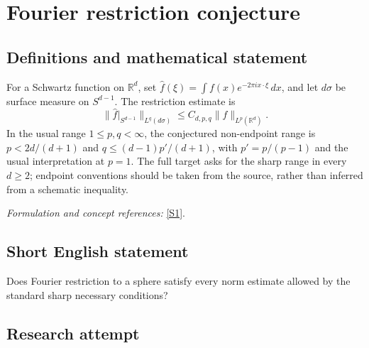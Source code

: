 \documentclass[11pt,a4paper]{article}
\newcommand{\R}{\mathbb{R}}
\newcommand{\sref}[2]{\hyperlink{source:#1:#2}{[S#2]}}
\newif\ifshowcatalogue
\newcommand{\cataloguescope}[1]{\ifshowcatalogue
 \paragraph{Exact scope in the supplied catalogue.}
 \begin{quote}\small #1\end{quote}\fi}
\numberwithin{equation}{section}
\begin{document}
\setcounter{section}{45}
\clearpage
\section{\texorpdfstring{Fourier restriction conjecture}{Fourier restriction conjecture}}\label{46}
\subsection{Definitions and mathematical statement}
For a Schwartz function on $\R^d$, set $\widehat f(\xi)=\int f(x)e^{-2\pi i x\cdot\xi}\,dx$, and let $d\sigma$ be surface measure on $S^{d-1}$. The restriction estimate is
\[
 \|\widehat f|_{S^{d-1}}\|_{L^q(d\sigma)}\le C_{d,p,q}\|f\|_{L^p(\R^d)}.
\]
In the usual range $1\le p,q<\infty$, the conjectured non-endpoint range is $p<2d/(d+1)$ and $q\le (d-1)p'/(d+1)$, with $p'=p/(p-1)$ and the usual interpretation at $p=1$. The full target asks for the sharp range in every $d\ge2$; endpoint conventions should be taken from the source, rather than inferred from a schematic inequality.
\par\smallskip\textit{Formulation and concept references:} \sref{46}{1}.
\cataloguescope{Prove the conjectured sharp L\textasciicircum{}p(R\textasciicircum{}d)-to-L\textasciicircum{}q(S\textasciicircum{}\{d-1\}) boundedness range for restriction of the Fourier transform to the unit sphere in every dimension d at least 2, including the non-endpoint range specified by the standard Knapp necessary conditions.}
\subsection{Short English statement}
Does Fourier restriction to a sphere satisfy every norm estimate allowed by the standard sharp necessary conditions?
\subsection{Research attempt}
\end{document}

